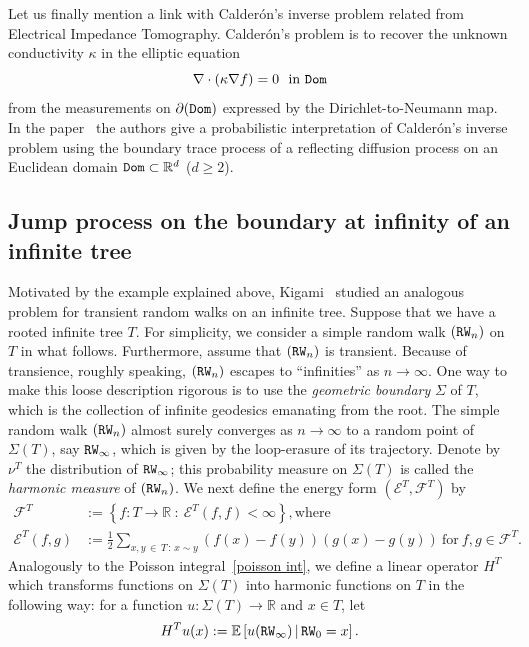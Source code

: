 \documentclass[AHL,Unicode,longabstracts,published]{cedram}
\newcommand{\ce}{\mathcal{E}}
\newcommand{\cf}{\mathcal{F}}
\newcommand{\br}{\mathbb{R}}
\newcommand{\be}{\mathbb{E}}
\begin{document}
Let us finally mention a link with Calderón's inverse problem related from Electrical Impedance Tomography. Calderón's problem is to recover the unknown conductivity $\kappa$ in the elliptic equation
\[
\nabla\cdot(\kappa\nabla f)=0\ \ \text{in}\ {\tt Dom}
\]
from the measurements on $\partial({\tt Dom})$ expressed by the Dirichlet-to-Neumann map. In the paper~\cite{PS} the authors give a probabilistic interpretation of Calderón's inverse problem using the boundary trace process of a reflecting diffusion process on an Euclidean domain ${\tt Dom}\subset\br^d$ ($d\geq2$).



\subsection*{Jump process on the boundary at infinity of an infinite tree}
Motivated by the example explained above, Kigami~\cite{Ki} studied an analogous problem for transient random walks on an infinite tree. Suppose that we have a rooted infinite tree $T$. For simplicity, we consider a simple random walk $({\tt RW}_n)$ on $T$ in what follows. Furthermore, assume that $({\tt RW}_n)$ is transient. Because of transience, roughly speaking, $({\tt RW}_n)$ escapes to ``infinities'' as $n\to\infty$. One way to make this loose description rigorous is to use the \emph{geometric boundary} $\Sigma$ of $T$, which is the collection of infinite geodesics emanating from the root. The simple random walk $({\tt RW}_n)$ almost surely converges as $n\to\infty$ to a random point of $\Sigma(T)$, say ${\tt RW}_\infty$, which is given by the loop-erasure of its trajectory. Denote by $\nu^T$ the distribution of ${\tt RW}_{\infty}$; this probability measure on $\Sigma(T)$ is called the \emph{harmonic measure} of $({\tt RW}_n)$. We next define the energy form $(\ce^T,\cf^T)$ by
\begin{align*}
\cf^T&:=\left\{f:T\to\br\ :\ \ce^T(f,f)<\infty\right\}, \text{where}\\
\ce^T(f,g)&:=\frac{1}{2}\sum_{x,y\,\in\,T\,:\,x\sim y}(f(x)-f(y))(g(x)-g(y))\ \text{for}\ f,g\in\cf^T.
\end{align*}
Analogously to the Poisson integral~\eqref{poisson int}, we define a linear operator $H^T$ which transforms functions on $\Sigma(T)$ into harmonic functions on $T$ in the following way: for a function $u:\Sigma(T)\to
\br$ and $x\in T$, let
\begin{equation}\label{HAR-EX}
H^Tu(x):=\be\left[u({\tt RW}_{\infty})\,\middle|\,{\tt RW}_0=x\right].
\end{equation}
\end{document}
